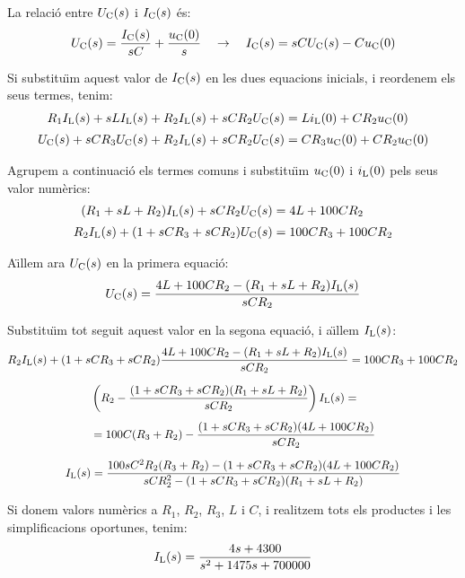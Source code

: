 \begin{exemple}
La relaci\'{o} entre $U_\mathrm{C}(s)$ i $I_\mathrm{C}(s)$ \'{e}s:
\begin{equation*}
    U_\mathrm{C}(s) = \frac{I_\mathrm{C}(s)}{s C} + \frac{u_\mathrm{C}(0)}{s}
    \quad\rightarrow\quad I_\mathrm{C}(s) = s C U_\mathrm{C}(s) - C u_\mathrm{C}(0)
\end{equation*}

Si substitu\"{\i}m aquest valor de $I_\mathrm{C}(s)$ en les dues equacions
inicials, i reordenem els seus termes, tenim:
\begin{align*}
    R_1 I_\mathrm{L}(s) + s L I_\mathrm{L}(s)  + R_2
    I_\mathrm{L}(s) + s C R_2 U_\mathrm{C}(s) &= L i_\mathrm{L}(0) + C R_2 u_\mathrm{C}(0)\\[0.5ex]
    U_\mathrm{C}(s) + s C R_3 U_\mathrm{C}(s) + R_2 I_\mathrm{L}(s) + s C R_2 U_\mathrm{C}(s)
    &= C R_3 u_\mathrm{C}(0) + C R_2 u_\mathrm{C}(0)
\end{align*}

Agrupem a continuaci\'{o} els termes comuns i substitu\"{\i}m $u_\mathrm{C}(0)$ i
$i_\mathrm{L}(0)$ pels seus valor num\`{e}rics:
\begin{align*}
    (R_1 + s L + R_2) I_\mathrm{L}(s) + s C R_2 U_\mathrm{C}(s) &= 4 L  + 100 C R_2\\[0.5ex]
    R_2 I_\mathrm{L}(s) + (1 +s C R_3 + s C R_2) U_\mathrm{C}(s) &= 100 C R_3  + 100 C R_2
\end{align*}

A\"{\i}llem ara $U_\mathrm{C}(s)$ en la primera equaci\'{o}:
\[
    U_\mathrm{C}(s) = \frac{4 L  + 100 C R_2 -(R_1 + s L + R_2) I_\mathrm{L}(s)}{s C R_2}
\]

Substitu\"{\i}m tot seguit aquest valor en la segona equaci\'{o}, i a\"{\i}llem
$I_\mathrm{L}(s)$:
\begin{gather*}
   R_2 I_\mathrm{L}(s) + (1 + s C R_3 + s C R_2) \frac{4 L  + 100 C R_2 - (R_1 + s L + R_2)I_\mathrm{L}(s)}{s C R_2} = 100 C R_3  + 100 C R_2 \\[1.5ex]
   \begin{split} &\left( R_2 - \frac{(1 +s C R_3 + s C R_2)(R_1 + s L + R_2)}{s C R_2} \right) I_\mathrm{L}(s)
   = \\[1ex] &= 100 C (R_3  + R_2) - \frac{(1 +s C R_3 + s C R_2)(4 L  + 100 C R_2)}{s C
   R_2}\end{split}\\[1.5ex]
I_\mathrm{L}(s) = \frac{100 s C^2 R_2(R_3  + R_2)- (1 +s C R_3 + s C
R_2)(4 L  + 100 C R_2)}{s C R_2^2  -(1 +s C R_3 + s C R_2)(R_1 + s L
+ R_2)}
\end{gather*}

Si donem valors num\`{e}rics a $R_1$, $R_2$, $R_3$, $L$ i $C$, i
realitzem tots els productes i les  simplificacions oportunes,
tenim:
\[
I_\mathrm{L}(s) = \frac{4 s+ 4300}{s^2 +1475 s + 700000}
\]


\end{exemple}
